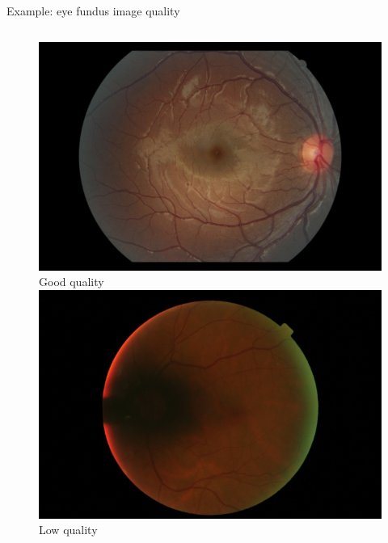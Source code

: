 \documentclass[xcolor=pdftex,dvipsnames,table,mathserif]{beamer}
\begin{document}
\begin{frame}{Example: eye fundus image quality~\tiny{\cite{alais_fast_2020}}}

\begin{columns}
  \begin{column}{.4\textwidth}
    \begin{figure}[ht]
      \centering
      \includegraphics[width=\textwidth]{fundus1}\\
      Good quality\vspace{1em}\\
      \includegraphics[width=\textwidth]{fundus2}\\
      Low quality
    \end{figure}

  \end{column}


\end{columns}
\end{frame}
\end{document}
